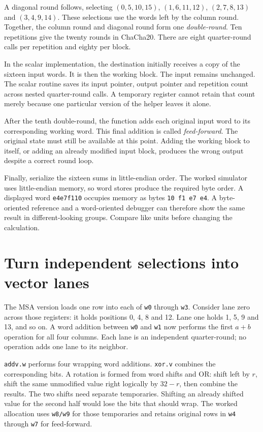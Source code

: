 A diagonal round follows, selecting $(0,5,10,15)$, $(1,6,11,12)$,
$(2,7,8,13)$ and $(3,4,9,14)$. These selections use the words left by the
column round. Together, the column round and diagonal round form one
\emph{double-round}. Ten repetitions give the twenty rounds in ChaCha20.
There are eight quarter-round calls per repetition and eighty per block.

In the scalar implementation, the destination initially receives a copy of the
sixteen input words. It is then the working block. The input remains unchanged.
The scalar routine saves its input pointer, output pointer and repetition count
across nested quarter-round calls. A temporary register cannot retain that
count merely because one particular version of the helper leaves it alone.

After the tenth double-round, the function adds each original input word to its
corresponding working word. This final addition is called \emph{feed-forward}.
The original state must still be available at this point. Adding the working
block to itself, or adding an already modified input block, produces the wrong
output despite a correct round loop.

Finally, serialize the sixteen sums in little-endian order. The worked
simulator uses little-endian memory, so word stores produce the required byte
order. A displayed word \texttt{e4e7f110} occupies memory as bytes
\texttt{10 f1 e7 e4}. A byte-oriented reference and a word-oriented debugger can
therefore show the same result in different-looking groups. Compare like units
before changing the calculation.



\section{Turn independent selections into vector lanes}

The MSA version loads one row into each of \texttt{w0} through \texttt{w3}.
Consider lane zero across those registers: it holds positions 0, 4, 8 and 12.
Lane one holds 1, 5, 9 and 13, and so on. A word addition between \texttt{w0}
and \texttt{w1} now performs the first $a+b$ operation for all four columns.
Each lane is an independent quarter-round; no operation adds one lane to its
neighbor.

\texttt{addv.w} performs four wrapping word additions. \texttt{xor.v} combines
the corresponding bits. A rotation is formed from word shifts and OR: shift
left by $r$, shift the same unmodified value right logically by $32-r$, then
combine the results. The two shifts need separate temporaries. Shifting an
already shifted value for the second half would lose the bits that should wrap.
The worked allocation uses \texttt{w8/w9} for those temporaries and retains
original rows in \texttt{w4} through \texttt{w7} for feed-forward.

